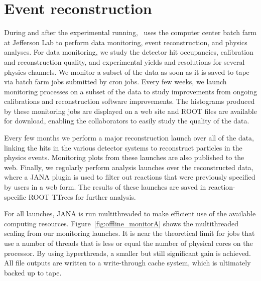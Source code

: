

\section[Event reconstruction]{Event reconstruction \label{sec:reconstruction}}


During and after the experimental running, \GX~uses the computer center batch farm at Jefferson Lab to perform data monitoring, event reconstruction, and physics analyses.  For data monitoring, we study the detector hit occupancies, calibration and reconstruction quality, and experimental yields and resolutions for several physics channels.  We monitor a subset of the data as soon as it is saved to tape via batch farm jobs submitted by cron jobs.  Every few weeks, we launch monitoring processes on a subset of the data to study improvements from ongoing calibrations and reconstruction software improvements.  The histograms produced by these monitoring jobs are displayed on a web site and ROOT files are available for download, enabling the collaborators to easily study the quality of the data. 

Every few months we perform a major reconstruction launch over all of the data, linking the hits in the various detector systems to reconstruct particles in the physics events.  Monitoring plots from these launches are also published to the web. Finally, we regularly perform analysis launches over the reconstructed data, where a JANA plugin is used to filter out reactions that were previously specified by users in a web form. The results of these launches are saved in reaction-specific ROOT TTrees for further analysis.

For all launches, JANA is run multithreaded to make efficient use of the available computing resources. Figure~\ref{fig:offline_monitorA} shows the multithreaded scaling from our monitoring launches. It is near the theoretical limit for jobs that use a number of threads that is less or equal the number of physical cores on the processor. By using hyperthreads, a smaller but still significant gain is achieved.
All file outputs are written to a write-through cache system, which is ultimately backed up to tape.

